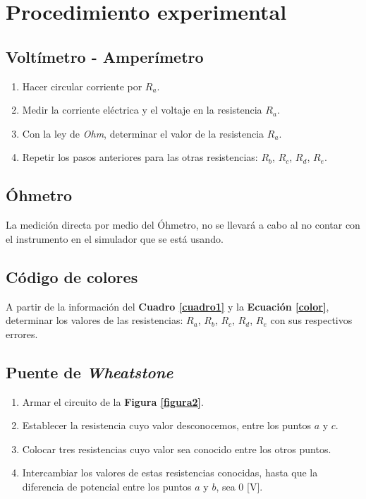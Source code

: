 \documentclass[letter,11pt]{article}
\begin{document}
\section{Procedimiento experimental}

\subsection{Voltímetro - Amperímetro}

\begin{enumerate}
\item Hacer circular corriente por $R_a$.
\item Medir la corriente eléctrica y el voltaje en la resistencia $R_a$.
\item Con la ley de \emph{Ohm}, determinar el valor de la resistencia $R_a$.
\item Repetir los pasos anteriores para las otras resistencias: $R_b$, $R_c$,
$R_d$, $R_e$.
\end{enumerate}

\subsection{Óhmetro}

La medición directa por medio del Óhmetro, no se llevará a cabo al no contar con
el instrumento en el simulador que se está usando.

\subsection{Código de colores}

A partir de la información del \textbf{Cuadro \ref{cuadro1}} y la
\textbf{Ecuación \ref{color}}, determinar los valores de las resistencias:
$R_a$, $R_b$, $R_c$, $R_d$, $R_e$ con sus respectivos errores.

\subsection{Puente de \emph{Wheatstone}}

\begin{enumerate}
\item Armar el circuito de la \textbf{Figura \ref{figura2}}.
\item Establecer la resistencia cuyo valor desconocemos, entre los puntos
    $a$ y $c$.
\item Colocar tres resistencias cuyo valor sea conocido entre los otros puntos.
\item Intercambiar los valores de estas resistencias conocidas, hasta que la
    diferencia de potencial entre los puntos $a$ y $b$, sea 0 [V].
\end{enumerate}
\end{document}
